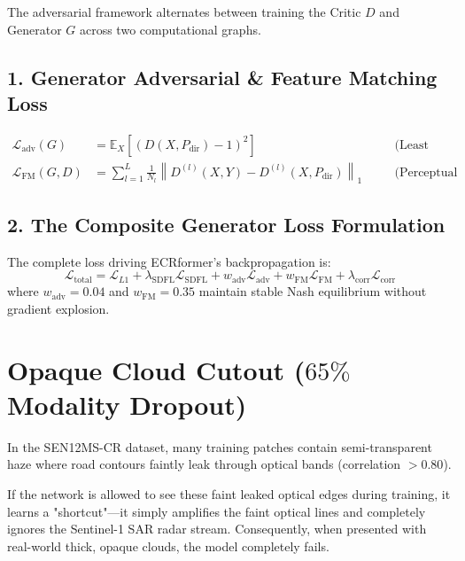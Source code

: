 \documentclass[11pt,a4paper]{article}
\begin{document}
The adversarial framework alternates between training the Critic $D$ and Generator $G$ across two computational graphs.

\subsection{1. Generator Adversarial \& Feature Matching Loss}
\begin{align}
\mathcal{L}_{\text{adv}}(G) &= \mathbb{E}_{X}\left[ \left( D(X, P_{\text{dir}}) - 1 \right)^2 \right] \quad &&\text{(Least Squares GAN penalty)}\\
\mathcal{L}_{\text{FM}}(G, D) &= \sum_{l=1}^L \frac{1}{N_l} \left\| D^{(l)}(X, Y) - D^{(l)}(X, P_{\text{dir}}) \right\|_1 \quad &&\text{(Perceptual feature matching)}
\end{align}

\subsection{2. The Composite Generator Loss Formulation}
The complete loss driving ECRformer's backpropagation is:
\begin{equation}
\mathcal{L}_{\text{total}} = \mathcal{L}_{L1} + \lambda_{\text{SDFL}} \mathcal{L}_{\text{SDFL}} + w_{\text{adv}} \mathcal{L}_{\text{adv}} + w_{\text{FM}} \mathcal{L}_{\text{FM}} + \lambda_{\text{corr}} \mathcal{L}_{\text{corr}}
\end{equation}
where $w_{\text{adv}} = 0.04$ and $w_{\text{FM}} = 0.35$ maintain stable Nash equilibrium without gradient explosion.

\section{Opaque Cloud Cutout ($65\%$ Modality Dropout)}

In the SEN12MS-CR dataset, many training patches contain semi-transparent haze where road contours faintly leak through optical bands (correlation $>0.80$). 

\begin{tcolorbox}[colback=white,colframe=accent,title=\textbf{The Modality Cheating Trap}]
If the network is allowed to see these faint leaked optical edges during training, it learns a "shortcut"---it simply amplifies the faint optical lines and completely ignores the Sentinel-1 SAR radar stream. Consequently, when presented with real-world thick, opaque clouds, the model completely fails.
\end{tcolorbox}
\end{document}
